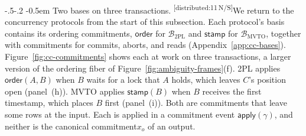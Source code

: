 \documentclass[sigconf]{cidr-2027}
\makeatletter
\theoremstyle{remark}
\renewcommand\paragraph{\@startsection{paragraph}{4}{\z@}%
  {-.5\baselineskip \@plus -2\p@ \@minus -.2\p@}%
  {-0.5em}%
  {\normalfont\bfseries}}
\newcommand{\commitment}{commitment\xspace}
\newcommand{\commitments}{commitments\xspace}
\newcommand{\cxtag}[2]{\textsuperscript{\textsf{\tiny[#1\,#2]}}}
\makeatother
\begin{document}
\paragraph{Two bases on three transactions.}
\color{black}\cxtag{distributed:11}{N/S}We return to the concurrency protocols from the start of this subsection.
Each protocol's basis contains its ordering \commitments, $\mathsf{order}$ for
$\mathcal B_{\mathrm{2PL}}$ and $\mathsf{stamp}$ for $\mathcal B_{\mathrm{MVTO}}$,
together with \commitments for commits, aborts, and reads
(Appendix~\ref{app:cc-bases}).  Figure~\ref{fig:cc-commitments} shows each at
work on three transactions, a larger version of the ordering fiber of
Figure~\ref{fig:ambiguity-frames}(f).  2PL applies $\mathsf{order}(A,B)$ when
$B$ waits for a lock that $A$ holds, which leaves $C$'s position open
(panel~(h)).  MVTO applies $\mathsf{stamp}(B)$ when $B$ receives the first
timestamp, which places $B$ first (panel~(i)).  Both are \commitments that
leave some rows at the input.  Each is applied in a \commitment event
$\mathsf{apply}(\gamma)$, and neither is the canonical \commitment $x_o$ of
an output.\color{black}
\end{document}
